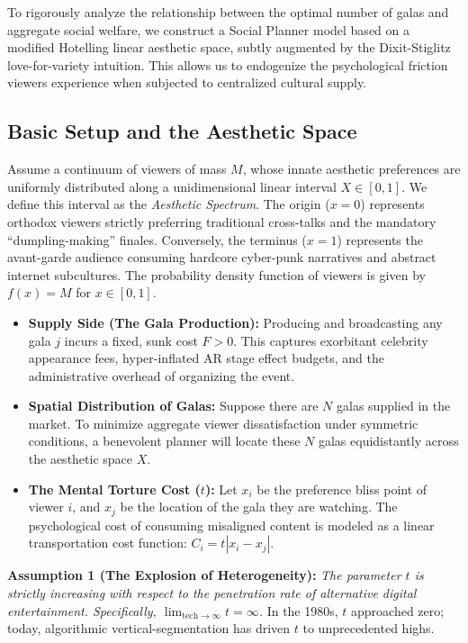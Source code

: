 \documentclass[AER]{AEA}
\begin{document}
To rigorously analyze the relationship between the optimal number of galas and aggregate social welfare, we construct a Social Planner model based on a modified Hotelling linear aesthetic space, subtly augmented by the Dixit-Stiglitz love-for-variety intuition. This allows us to endogenize the psychological friction viewers experience when subjected to centralized cultural supply.

\subsection{Basic Setup and the Aesthetic Space}

Assume a continuum of viewers of mass $M$, whose innate aesthetic preferences are uniformly distributed along a unidimensional linear interval $X \in [0, 1]$. We define this interval as the \textit{Aesthetic Spectrum}. The origin ($x = 0$) represents orthodox viewers strictly preferring traditional cross-talks and the mandatory ``dumpling-making'' finales. Conversely, the terminus ($x = 1$) represents the avant-garde audience consuming hardcore cyber-punk narratives and abstract internet subcultures. The probability density function of viewers is given by $f(x) = M$ for $x \in [0, 1]$.

\begin{itemize}
    \item \textbf{Supply Side (The Gala Production):} Producing and broadcasting any gala $j$ incurs a fixed, sunk cost $F > 0$. This captures exorbitant celebrity appearance fees, hyper-inflated AR stage effect budgets, and the administrative overhead of organizing the event.
    \item \textbf{Spatial Distribution of Galas:} Suppose there are $N$ galas supplied in the market. To minimize aggregate viewer dissatisfaction under symmetric conditions, a benevolent planner will locate these $N$ galas equidistantly across the aesthetic space $X$.
    \item \textbf{The Mental Torture Cost ($t$):} Let $x_i$ be the preference bliss point of viewer $i$, and $x_j$ be the location of the gala they are watching. The psychological cost of consuming misaligned content is modeled as a linear transportation cost function: $C_i = t |x_i - x_j|$.
\end{itemize}

\textbf{Assumption 1 (The Explosion of Heterogeneity):} \textit{The parameter $t$ is strictly increasing with respect to the penetration rate of alternative digital entertainment. Specifically, $\lim_{\text{tech} \to \infty} t = \infty$.} In the 1980s, $t$ approached zero; today, algorithmic vertical-segmentation has driven $t$ to unprecedented highs.
\end{document}
